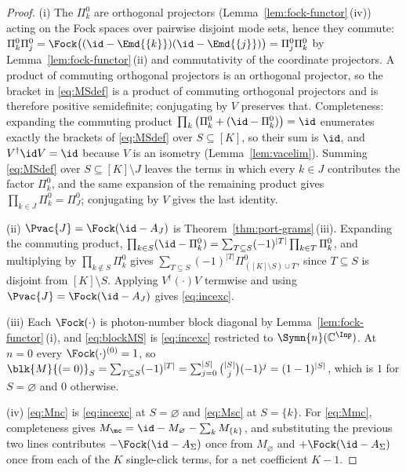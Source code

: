 \begin{proof}
(i) The $\Pi^0_k$ are orthogonal projectors (Lemma~\ref{lem:fock-functor}\,(iv))
acting on the Fock spaces over pairwise disjoint mode sets, hence they commute:
$\Pi^0_k\Pi^0_j=\Fock\big((\id-\Emd{\{k\}})(\id-\Emd{\{j\}})\big)=\Pi^0_j
\Pi^0_k$ by Lemma~\ref{lem:fock-functor}\,(ii) and commutativity of the coordinate
projectors. A product of commuting orthogonal projectors is an orthogonal
projector, so the bracket in \eqref{eq:MSdef} is a product of commuting
orthogonal projectors and is therefore positive semidefinite; conjugating by
$V$ preserves that. Completeness: expanding the commuting product
$\prod_{k}\big(\Pi^0_k+(\id-\Pi^0_k)\big)=\id$ enumerates exactly the brackets
of \eqref{eq:MSdef} over $S\subseteq[K]$, so their sum is $\id$, and
$V^\dagger\id V=\id$ because $V$ is an isometry (Lemma~\ref{lem:vacelim}).
Summing \eqref{eq:MSdef} over $S\subseteq[K]\setminus J$ leaves the terms in
which every $k\in J$ contributes the factor $\Pi^0_k$, and the same expansion
of the remaining product gives $\prod_{k\in J}\Pi^0_k=\Pi^0_J$; conjugating by
$V$ gives the last identity.

(ii) $\Pvac{J}=\Fock(\id-A_J)$ is Theorem~\ref{thm:port-grams}\,(iii). Expanding the
commuting product,
$\prod_{k\in S}(\id-\Pi^0_k)=\sum_{T\subseteq S}(-1)^{|T|}\prod_{k\in T}
\Pi^0_k$, and multiplying by $\prod_{k\notin S}\Pi^0_k$ gives
$\sum_{T\subseteq S}(-1)^{|T|}\Pi^0_{([K]\setminus S)\cup T}$, since
$T\subseteq S$ is disjoint from $[K]\setminus S$. Applying
$V^\dagger(\cdot)V$ termwise and using $\Pvac{J}=\Fock(\id-A_J)$ gives
\eqref{eq:incexc}.

(iii) Each $\Fock(\cdot)$ is photon-number block diagonal by
Lemma~\ref{lem:fock-functor}\,(i), and \eqref{eq:blockMS} is \eqref{eq:incexc}
restricted to $\Symn{n}(\mathbb{C}^{\Inp})$. At $n=0$ every
$\Fock(\cdot)^{(0)}=1$, so $\blk{M}{(=0)}_S=\sum_{T\subseteq S}(-1)^{|T|}
=\sum_{j=0}^{|S|}\binom{|S|}{j}(-1)^j=(1-1)^{|S|}$, which is $1$ for
$S=\varnothing$ and $0$ otherwise.

(iv) \eqref{eq:Mnc} is \eqref{eq:incexc} at $S=\varnothing$ and \eqref{eq:Msc}
at $S=\{k\}$. For \eqref{eq:Mmc}, completeness gives
$M_{\mc}=\id-M_{\varnothing}-\sum_kM_{\{k\}}$, and substituting the previous
two lines contributes $-\Fock(\id-A_\Sigma)$ once from $M_\varnothing$ and
$+\Fock(\id-A_\Sigma)$ once from each of the $K$ single-click terms, for a net
coefficient $K-1$.
\end{proof}
